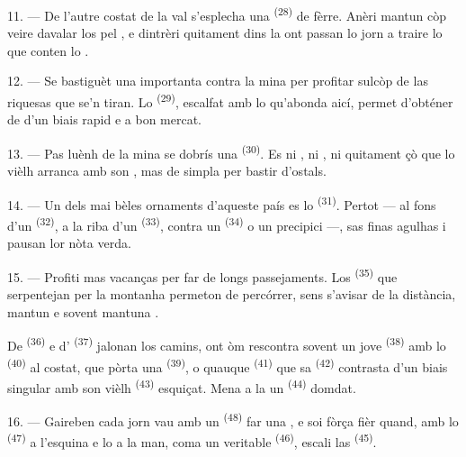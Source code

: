 11. --- De l'autre costat de la val s'esplecha una 
\textsuperscript{(28)} de fèrre. Anèri mantun còp veire davalar los
 pel , e dintrèri quitament dins la
 ont passan lo jorn a traire lo  que conten lo
.

12. --- Se bastiguèt una importanta  contra la mina per profitar
sulcòp de las riquesas que se'n tiran. Lo 
\textsuperscript{(29)}, escalfat amb lo  qu'abonda aicí,
permet d'obténer de  d'un biais rapid e a bon mercat.

13. --- Pas luènh de la mina se dobrís una 
\textsuperscript{(30)}. Es ni , ni , ni quitament
 çò que lo vièlh  arranca amb son , mas
de simpla  per bastir d'ostals.

14. --- Un dels mai bèles ornaments d'aqueste país es lo 
\textsuperscript{(31)}. Pertot --- al fons d'un 
\textsuperscript{(32)}, a la riba d'un  \textsuperscript{(33)},
contra un  \textsuperscript{(34)} o un precipici ---, sas finas
agulhas i pausan lor nòta verda.

\VUsaut{3.0mm}
\VUsaut{3.0mm}

15. --- Profiti mas vacanças per far de longs passejaments. Los 
\textsuperscript{(35)} que serpentejan per la montanha permeton de percórrer, sens
s'avisar de la distància, mantun  e sovent mantuna
.

De  \textsuperscript{(36)} e d'
\textsuperscript{(37)} jalonan los camins, ont òm rescontra sovent un jove
 \textsuperscript{(38)} amb lo 
\textsuperscript{(40)} al costat, que pòrta una 
\textsuperscript{(39)}, o quauque  \textsuperscript{(41)} que sa
 \textsuperscript{(42)} contrasta d'un biais singular amb
son vièlh  \textsuperscript{(43)} esquiçat. Mena a la
 un  \textsuperscript{(44)} domdat.

\VUsaut{3.0mm}

16. --- Gaireben cada jorn vau amb un  \textsuperscript{(48)} far una
, e soi fòrça fièr quand, amb lo 
\textsuperscript{(47)} a l'esquina e lo  a la man, coma un
veritable  \textsuperscript{(46)}, escali las 
\textsuperscript{(45)}.

